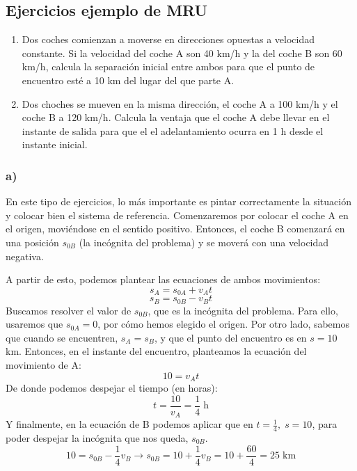 \documentclass[ %
    oneside,    %
    10pt        %
]{apuntes} %
\begin{document}
\begin{examplebox}
	\subsection*{Ejercicios ejemplo de MRU}
	\begin{enumerate}[label = \alph*) ]
		\item Dos coches comienzan a moverse en direcciones opuestas a velocidad constante. Si la velocidad del coche A son 40 km/h y la del coche B son 60 km/h, calcula la separación inicial entre ambos para que el punto de encuentro esté a 10 km del lugar del que parte A.
		\item Dos choches se mueven en la misma dirección, el coche A a 100 km/h y el coche B a 120 km/h. Calcula la ventaja que el coche A debe llevar en el instante de salida para que el el adelantamiento ocurra en 1 h desde el instante inicial.
	\end{enumerate}

	\subsubsection*{a)}
	En este tipo de ejercicios, lo más importante es pintar correctamente la situación y colocar bien el sistema de referencia. Comenzaremos por colocar el coche A en el origen, moviéndose en el sentido positivo. Entonces, el coche B comenzará en una posición $s_{0B}$ (la incógnita del problema) y se moverá con una velocidad negativa.

	\begin{center}
	\end{center}

	A partir de esto, podemos plantear las ecuaciones de ambos movimientos:
	\[ s_A = s_{0A} + v_A t\]
	\[ s_B = s_{0B} - v_B t\]
	Buscamos resolver el valor de $s_{0B}$, que es la incógnita del problema. Para ello, usaremos que $s_{0A} = 0$, por cómo hemos elegido el origen. Por otro lado, sabemos que cuando se encuentren, $s_A = s_B$, y que el punto del encuentro es en $s = 10$ km. Entonces, en el instante del encuentro, planteamos la ecuación del movimiento de A:
	\[ 10 = v_A t\]
	De donde podemos despejar el tiempo (en horas):
	\[ t = \frac{10}{v_A} = \frac1{4}\;\text{h}\]
	Y finalmente, en la ecuación de B podemos aplicar que en $ t = \frac{1}{4},\; s = 10$, para poder despejar la incógnita que nos queda, $s_{0B}$.
	\[ 10 = s_{0B} - \frac1{4} v_B \to s_{0B} = 10 + \frac{1}{4}v_B = 10 + \frac{60}{4} = 25\;\text{km}\]



\end{examplebox}
\end{document}
